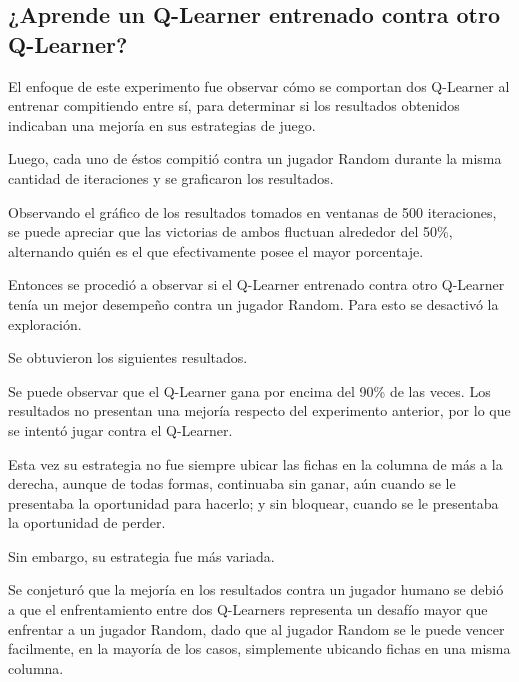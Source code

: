 \subsection{¿Aprende un Q-Learner entrenado contra otro Q-Learner?}

El enfoque de este experimento fue observar cómo se comportan dos Q-Learner al entrenar compitiendo entre sí, para determinar si los resultados obtenidos indicaban una mejoría en sus estrategias de juego.

Luego, cada uno de éstos compitió contra un jugador Random durante la misma cantidad de iteraciones y se graficaron los resultados.


Observando el gráfico de los resultados tomados en ventanas de 500 iteraciones, se puede apreciar que las victorias de ambos fluctuan alrededor del 50\%, alternando quién es el que efectivamente posee el mayor porcentaje.

Entonces se procedió a observar si el Q-Learner entrenado contra otro Q-Learner tenía un mejor desempeño contra un jugador Random. Para esto se desactivó la exploración.

Se obtuvieron los siguientes resultados.


Se puede observar que el Q-Learner gana por encima del 90\% de las veces. Los resultados no presentan una mejoría respecto del experimento anterior, por lo que se intentó jugar contra el Q-Learner.

Esta vez su estrategia no fue siempre ubicar las fichas en la columna de más a la derecha, aunque de todas formas, continuaba sin ganar, aún cuando se le presentaba la oportunidad para hacerlo; y sin bloquear, cuando se le presentaba la oportunidad de perder.

Sin embargo, su estrategia fue más variada.

Se conjeturó que la mejoría en los resultados contra un jugador humano se debió a que el enfrentamiento entre dos Q-Learners representa un desafío mayor que enfrentar a un jugador Random, dado que al jugador Random se le puede vencer facilmente, en la mayoría de los casos, simplemente ubicando fichas en una misma columna.
